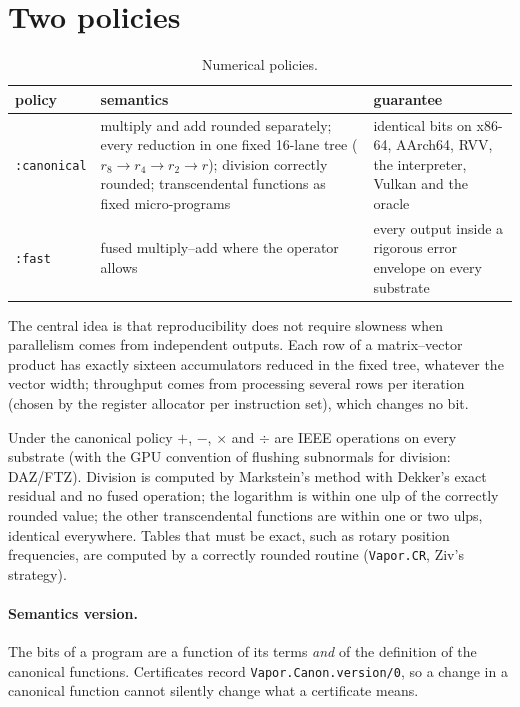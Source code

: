 \section{Two policies}

\begin{table}[h]
\centering\small
\begin{tabularx}{\textwidth}{@{}lXX@{}}
\toprule
policy & semantics & guarantee \\
\midrule
\texttt{:canonical} & multiply and add rounded separately; every reduction in one fixed 16-lane tree
($r_8 \to r_4 \to r_2 \to r$); division correctly rounded; transcendental functions as fixed
micro-programs & identical bits on x86-64, AArch64, RVV, the interpreter, Vulkan and the oracle \\
\texttt{:fast} & fused multiply--add where the operator allows & every output inside a rigorous error
envelope on every substrate \\
\bottomrule
\end{tabularx}
\caption{Numerical policies.}
\end{table}

The central idea is that reproducibility does not require slowness when parallelism comes from
independent outputs. Each row of a matrix--vector product has exactly sixteen accumulators reduced in
the fixed tree, whatever the vector width; throughput comes from processing several rows per iteration
(chosen by the register allocator per instruction set), which changes no bit.

Under the canonical policy $+$, $-$, $\times$ and $\div$ are IEEE operations on every substrate (with
the GPU convention of flushing subnormals for division: DAZ/FTZ). Division is computed by Markstein's
method with Dekker's exact residual and no fused operation; the logarithm is within one ulp of the
correctly rounded value; the other transcendental functions are within one or two ulps, identical
everywhere. Tables that must be exact, such as rotary position frequencies, are computed by a
correctly rounded routine (\texttt{Vapor.CR}, Ziv's strategy).

\paragraph{Semantics version.} The bits of a program are a function of its terms \emph{and} of the
definition of the canonical functions. Certificates record \texttt{Vapor.Canon.version/0}, so a change
in a canonical function cannot silently change what a certificate means.

